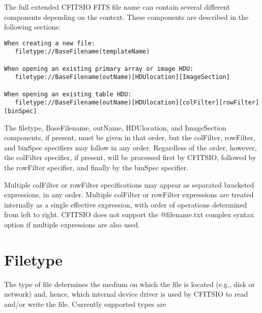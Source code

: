 \documentclass[11pt]{book}
\begin{document}
The full extended CFITSIO FITS file name can contain several different
components depending on the context.  These components are described in
the following sections:

\begin{verbatim}
When creating a new file:
   filetype://BaseFilename(templateName)

When opening an existing primary array or image HDU:
   filetype://BaseFilename(outName)[HDUlocation][ImageSection]

When opening an existing table HDU:
   filetype://BaseFilename(outName)[HDUlocation][colFilter][rowFilter][binSpec]
\end{verbatim}
The filetype, BaseFilename, outName, HDUlocation, and ImageSection
components, if present, must be given in that order, but the colFilter,
rowFilter, and binSpec specifiers may follow in any order.  Regardless
of the order, however, the colFilter specifier, if present, will be
processed first by CFITSIO, followed by the rowFilter specifier, and
finally by the binSpec specifier.


Multiple colFilter or rowFilter specifications may appear as separated
bracketed expressions, in any order.  Multiple colFilter or rowFilter
expressions are treated internally as a single effective expression,
with order of operations determined from left to right.  CFITSIO does
not support the @filename.txt complex syntax option if multiple
expressions are also used.

\section{Filetype}

The type of file determines the medium on which the file is located
(e.g., disk or network) and, hence, which internal device driver is used by
CFITSIO to read and/or write the file.  Currently supported types are
\end{document}
